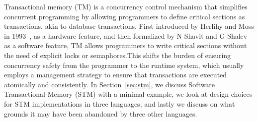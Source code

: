 Transactional memory (TM) is a concurrency control mechanism
that simplifies concurrent programming by allowing programmers
to define critical sections as transactions, akin to database transactions.
First introduced by Herlihy and Moss in 1993~\cite{herlihy1993hardware},
as a hardware feature, and then formalized by N Shavit and G Shalev~\cite{shavit1995software}
as a software feature, TM allows programmers to write critical sections without the need of 
explicit locks or semaphores.This shifts the burden of ensuring concurrency safety
from the programmer to the runtime system, which usually employs a management strategy
to ensure that transactions are executed atomically and consistently.
In Section~\ref{sec:stm}, we discuss Software Transactional Memory (STM) with a minimal example,
we look at design choices for STM implementations in three languages; 
and lastly we discuss on what grounds it may have been abandoned by three other languages.
 